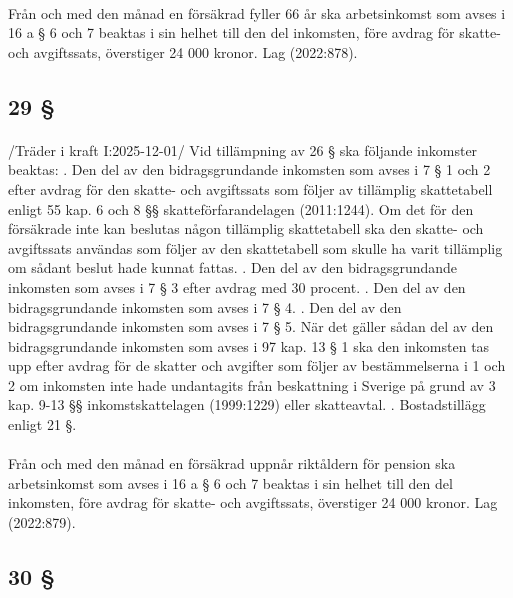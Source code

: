 \documentclass[a4paper,notitlepage,openany,10pt]{book}
\begin{document}
\paragraph*{}
Från och med den månad en försäkrad fyller 66 år ska arbetsinkomst som avses i 16 a § 6 och 7 beaktas i sin helhet till den del inkomsten, före avdrag för skatte- och avgiftssats, överstiger 24 000 kronor.
Lag (2022:878).
\subsection*{29 §}
\paragraph*{}
/Träder i kraft I:2025-12-01/
Vid tillämpning av 26 § ska följande inkomster beaktas:
. Den del av den bidragsgrundande inkomsten som avses i 7 § 1 och 2 efter avdrag för den skatte- och avgiftssats som följer av tillämplig skattetabell enligt 55 kap. 6 och 8 §§ skatteförfarandelagen (2011:1244). Om det för den försäkrade inte kan beslutas någon tillämplig skattetabell ska den skatte- och avgiftssats användas som följer av den skattetabell som skulle ha varit tillämplig om sådant beslut hade kunnat fattas.
. Den del av den bidragsgrundande inkomsten som avses i 7 § 3 efter avdrag med 30 procent.
. Den del av den bidragsgrundande inkomsten som avses i 7 § 4.
. Den del av den bidragsgrundande inkomsten som avses i 7 § 5. När det gäller sådan del av den bidragsgrundande inkomsten som avses i 97 kap. 13 § 1 ska den inkomsten tas upp efter avdrag för de skatter och avgifter som följer av bestämmelserna i 1 och 2 om inkomsten inte hade undantagits från beskattning i Sverige på grund av 3 kap. 9-13 §§ inkomstskattelagen (1999:1229) eller skatteavtal.
. Bostadstillägg enligt 21 §.
\paragraph*{}
Från och med den månad en försäkrad uppnår riktåldern för pension ska arbetsinkomst som avses i 16 a § 6 och 7 beaktas i sin helhet till den del inkomsten, före avdrag för skatte- och avgiftssats, överstiger 24 000 kronor.
Lag (2022:879).
\subsection*{30 §}
\end{document}
